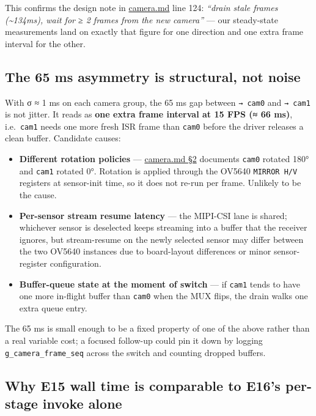 This confirms the design note in \url{camera.md} line 124: \emph{``drain
stale frames (\textasciitilde134ms), wait for ≥ 2 frames from the new
camera''} --- our steady-state measurements land on exactly that figure
for one direction and one extra frame interval for the other.

\subsection{The 65 ms asymmetry is structural, not
noise}\label{the-65-ms-asymmetry-is-structural-not-noise}

With σ ≈ 1 ms on each camera group, the 65 ms gap between
\texttt{→\ cam0} and \texttt{→\ cam1} is not jitter. It reads as
\textbf{one extra frame interval at 15 FPS (≈ 66 ms)},
i.e.~\texttt{cam1} needs one more fresh ISR frame than \texttt{cam0}
before the driver releases a clean buffer. Candidate causes:

\begin{itemize}
\tightlist
\item
  \textbf{Different rotation policies} --- \href{camera.md}{camera.md
  §2} documents \texttt{cam0} rotated 180° and \texttt{cam1} rotated 0°.
  Rotation is applied through the OV5640 \texttt{MIRROR\ H/V} registers
  at sensor-init time, so it does not re-run per frame. Unlikely to be
  the cause.
\item
  \textbf{Per-sensor stream resume latency} --- the MIPI-CSI lane is
  shared; whichever sensor is deselected keeps streaming into a buffer
  that the receiver ignores, but stream-resume on the newly selected
  sensor may differ between the two OV5640 instances due to board-layout
  differences or minor sensor-register configuration.
\item
  \textbf{Buffer-queue state at the moment of switch} --- if
  \texttt{cam1} tends to have one more in-flight buffer than
  \texttt{cam0} when the MUX flips, the drain walks one extra queue
  entry.
\end{itemize}

The 65 ms is small enough to be a fixed property of one of the above
rather than a real variable cost; a focused follow-up could pin it down
by logging \texttt{g\_camera\_frame\_seq} across the switch and counting
dropped buffers.

\subsection{Why E15 wall time is comparable to E16's per-stage invoke
alone}\label{why-e15-wall-time-is-comparable-to-e16s-per-stage-invoke-alone}

